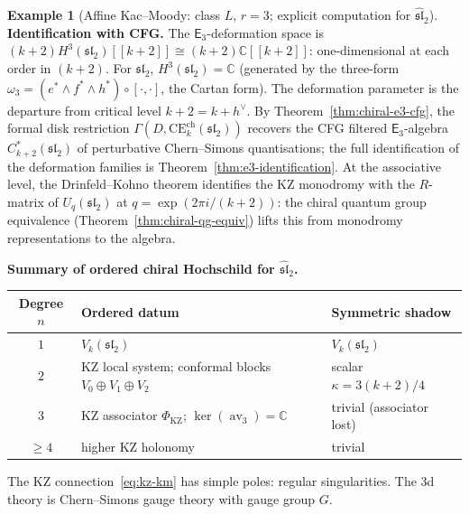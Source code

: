 \documentclass[11pt,reqno]{amsart}
\theoremstyle{definition}
\newtheorem{example}[theorem]{Example}
\theoremstyle{remark}
\newcommand{\CE}{\mathrm{CE}}
\newcommand{\Ethree}{\mathsf{E}_{3}}
\DeclareMathOperator{\av}{av}
\newcommand{\CC}{\mathbb{C}}
\numberwithin{equation}{section}
\begin{document}
\begin{example}[Affine Kac--Moody: class $L$, $r = 3$;
explicit computation for $\widehat{\mathfrak{sl}}_2$]
\smallskip
\noindent\textbf{Identification with CFG.}
The $\Ethree$-deformation space is
$(k+2) H^3(\mathfrak{sl}_2)[[k+2]]
\cong (k+2)\CC[[k+2]]$:
one-dimensional at each order in $(k+2)$.
For $\mathfrak{sl}_2$,
$H^3(\mathfrak{sl}_2) = \CC$ (generated by the
three-form $\omega_3 = (e^* \wedge f^* \wedge h^*) \circ
[\cdot, \cdot]$, the Cartan form).
The deformation parameter is the departure from critical
level $k + 2 = k + h^\vee$.
By Theorem~\ref{thm:chiral-e3-cfg}, the formal disk
restriction $\Gamma(D, \CE^{\mathrm{ch}}_k(\mathfrak{sl}_2))$
recovers the CFG filtered $\Ethree$-algebra
$C^*_{k+2}(\mathfrak{sl}_2)$ of perturbative Chern--Simons
quantisations; the full identification of the deformation
families is Theorem~\ref{thm:e3-identification}.
At the associative level, the Drinfeld--Kohno theorem
identifies the KZ monodromy with the $R$-matrix of
$U_q(\mathfrak{sl}_2)$ at $q = \exp(2\pi i/(k + 2))$:
the chiral quantum group equivalence
(Theorem~\ref{thm:chiral-qg-equiv}) lifts this from
monodromy representations to the algebra.

\smallskip
\noindent\textbf{Summary of ordered chiral Hochschild for
$\widehat{\mathfrak{sl}}_2$.}
\begin{center}
\begin{tabular}{@{} c l l @{}}
\toprule
Degree $n$ & Ordered datum & Symmetric shadow \\
\midrule
$1$ & $V_k(\mathfrak{sl}_2)$ & $V_k(\mathfrak{sl}_2)$ \\
$2$ & KZ local system; conformal blocks
      $V_0 \oplus V_1 \oplus V_2$
    & scalar $\kappa = 3(k+2)/4$ \\
$3$ & KZ associator $\Phi_{\mathrm{KZ}}$;
      $\ker(\av_3) = \CC$
    & trivial (associator lost) \\
$\geq 4$ & higher KZ holonomy
    & trivial \\
\bottomrule
\end{tabular}
\end{center}

The KZ connection~\eqref{eq:kz-km} has simple poles:
regular singularities. The $3$d theory is Chern--Simons
gauge theory with gauge group $G$.
\end{example}
\end{document}
